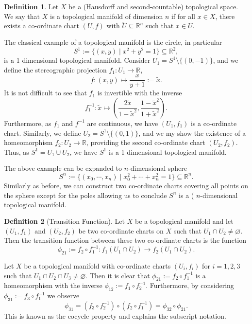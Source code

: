 \documentclass[]{article}
\theoremstyle{definition}
\theoremstyle{definition}
\newtheorem{definition}{Definition}[section]
\begin{document}
\begin{definition}
  Let \(X\) be a (Hausdorff and second-countable) topological space. We say 
  that \(X\) is a topological manifold of dimension \(n\) if for all 
  \(x \in X\), there exists a co-ordinate chart \((U, f)\) with 
  \(\tilde U \subseteq \mathbb{R}^n\) such that \(x \in U\).
\end{definition}

The classical example of a topological manifold is the circle, in particular 
\[S^1 := \{(x, y) \mid x^2 + y^2 = 1\} \subseteq \mathbb{R}^2,\]
is a 1 dimensional topological manifold. Consider \(U_1 = S^1 \setminus \{(0, -1)\}\),
and we define the stereographic projection \(f_1 : U_1 \to \mathbb{R}\), 
\[f : (x, y) \mapsto \frac{x}{y + 1} := \tilde x.\]
It is not difficult to see that \(f_1\) is invertible with the inverse 
\[f_1^{-1} : \tilde x \mapsto \left(\frac{2\tilde x}{1 + {\tilde x}^2}, 
  \frac{1 - {\tilde x}^2}{1 + {\tilde x}^2}\right).\]
Furthermore, as \(f_1\) and \(f^{-1}\) are continuous, we have \((U_1, f_1)\) is 
a co-ordinate chart. Similarly, we define \(U_2 = S^1 \setminus \{(0, 1)\}\), 
and we my show the existence of a homeomorphism \(f_2 : U_2 \to \mathbb{R}\), 
providing the second co-ordinate chart \((U_2, f_2)\). Thus, as 
\(S^1 = U_1 \cup U_2\), we have \(S^1\) is a 1 dimensional topological manifold.

The above example can be expanded to \(n\)-dimensional sphere 
\[S^n := \{(x_0, \cdots, x_n) \mid x_0^2 + \cdots + x_n^2 = 1\} 
  \subseteq \mathbb{R}^n.\]
Similarly as before, we can construct two co-ordinate charts covering all points 
on the sphere except for the poles allowing us to conclude \(S^n\) is a (
\(n\)-dimensional topological manifold.

\begin{definition}[Transition Function]
  Let \(X\) be a topological manifold and let \((U_1, f_1)\) and \((U_2, f_2)\) 
  be two co-ordinate charts on \(X\) such that \(U_1 \cap U_2 \neq \varnothing\). 
  Then the transition function between these two co-ordinate charts is the 
  function 
  \[\phi_{21} := f_2 \circ f_1^{-1} : f_1(U_1 \cap U_2) \to f_2(U_1 \cap U_2).\]
\end{definition}

Let \(X\) be a topological manifold with co-ordinate charts \((U_i, f_i)\) for 
\(i = 1, 2, 3\) such that \(U_1 \cap U_2 \cap U_3 \neq \varnothing\). Then it 
is clear that \(\phi_{21} := f_2 \circ f_1^{-1}\) is a homeomorphism with 
the inverse \(\phi_{12} := f_1 \circ f_2^{-1}\). Furthermore, by considering 
\(\phi_{31} := f_3 \circ f_1^{-1}\) we observe 
\[\phi_{31} = (f_3 \circ f_2^{-1}) \circ (f_2 \circ f_1^{-1}) = 
  \phi_{32} \circ \phi_{21}.\]
This is known as the cocycle property and explains the subscript notation.
\end{document}

